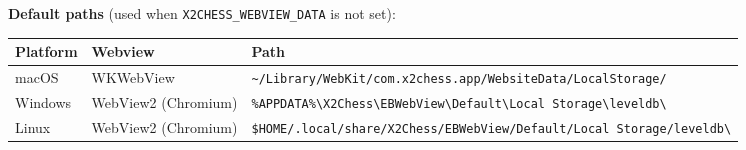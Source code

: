 \documentclass[]{article}
\begin{document}
\textbf{Default paths} (used when \texttt{X2CHESS\_WEBVIEW\_DATA} is not
set):

\begin{longtable}[]{@{}lll@{}}
\toprule
\begin{minipage}[b]{0.05\columnwidth}\raggedright\strut
Platform\strut
\end{minipage} & \begin{minipage}[b]{0.05\columnwidth}\raggedright\strut
Webview\strut
\end{minipage} & \begin{minipage}[b]{0.05\columnwidth}\raggedright\strut
Path\strut
\end{minipage}\tabularnewline
\midrule
\endhead
\begin{minipage}[t]{0.05\columnwidth}\raggedright\strut
macOS\strut
\end{minipage} & \begin{minipage}[t]{0.05\columnwidth}\raggedright\strut
WKWebView\strut
\end{minipage} & \begin{minipage}[t]{0.05\columnwidth}\raggedright\strut
\texttt{\textasciitilde{}/Library/WebKit/com.x2chess.app/WebsiteData/LocalStorage/}\strut
\end{minipage}\tabularnewline
\begin{minipage}[t]{0.05\columnwidth}\raggedright\strut
Windows\strut
\end{minipage} & \begin{minipage}[t]{0.05\columnwidth}\raggedright\strut
WebView2 (Chromium)\strut
\end{minipage} & \begin{minipage}[t]{0.05\columnwidth}\raggedright\strut
\texttt{\%APPDATA\%\textbackslash{}X2Chess\textbackslash{}EBWebView\textbackslash{}Default\textbackslash{}Local\ Storage\textbackslash{}leveldb\textbackslash{}}\strut
\end{minipage}\tabularnewline
\begin{minipage}[t]{0.05\columnwidth}\raggedright\strut
Linux\strut
\end{minipage} & \begin{minipage}[t]{0.05\columnwidth}\raggedright\strut
WebView2 (Chromium)\strut
\end{minipage} & \begin{minipage}[t]{0.05\columnwidth}\raggedright\strut
\texttt{\$HOME/.local/share/X2Chess/EBWebView/Default/Local\ Storage/leveldb\textbackslash{}}\strut
\end{minipage}\tabularnewline
\bottomrule
\end{longtable}
\end{document}

